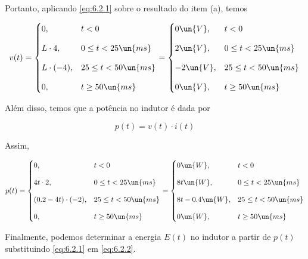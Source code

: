 Portanto, aplicando \eqref{eq:6.2.1} sobre o resultado do item (a), temos

\[ v(t) =
    \begin{cases}
        0,   & t < 0                 \\
        \noalign{\vskip9pt}
        L \cdot 4,  & 0 \leq t < 25 \un{ms} \\
        \noalign{\vskip9pt}
        L \cdot (-4), & 25 \leq t < 50 \un{ms} \\
        \noalign{\vskip9pt}
        0,   & t \geq 50 \un{ms}
    \end{cases}
    =
    \begin{cases}
        0 \un{V},   & t < 0                 \\
        \noalign{\vskip9pt}
        2 \un{V},  & 0 \leq t < 25 \un{ms} \\
        \noalign{\vskip9pt}
        -2 \un{V}, & 25 \leq t < 50 \un{ms} \\
        \noalign{\vskip9pt}
        0 \un{V},   & t \geq 50 \un{ms}
    \end{cases}
\]

Além disso, temos que a potência no indutor é dada por   

\begin{equation}\label{eq:6.2.2}
    p(t) = v(t) \cdot i(t)
\end{equation}

Assim,

\[ p(t) =
    \begin{cases}
        0,   & t < 0                 \\
        \noalign{\vskip9pt}
        4t \cdot 2,  & 0 \leq t < 25 \un{ms} \\
        \noalign{\vskip9pt}
        (0.2 - 4t)\cdot (-2), & 25 \leq t < 50 \un{ms} \\
        \noalign{\vskip9pt}
        0,   & t \geq 50 \un{ms}
    \end{cases}
    =
    \begin{cases}
        0 \un{W},   & t < 0                 \\
        \noalign{\vskip9pt}
        8t \un{W},  & 0 \leq t < 25 \un{ms} \\
        \noalign{\vskip9pt}
        8t - 0.4 \un{W}, & 25 \leq t < 50 \un{ms} \\
        \noalign{\vskip9pt}
        0 \un{W},   & t \geq 50 \un{ms}
    \end{cases}
\]

Finalmente, podemos determinar a energia $E(t)$ no indutor a partir de $p(t)$ substituindo \eqref{eq:6.2.1} em \eqref{eq:6.2.2}.

